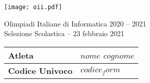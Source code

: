 \documentclass[a4paper]{article}
\begin{document}

\begin{center}
    \begin{minipage}{0.45\textwidth}
        \centering
        \texttt{[image: oii.pdf]}\\
    \end{minipage}
\end{center}

\vspace{0.15cm}

\begin{center}
    \Huge
    Olimpiadi Italiane di Informatica
    \huge 2020 -- 2021
    \\
    \LARGE Selezione Scolastica -- 23 febbraio 2021
\end{center}

\vspace{1cm}

{
    \Large

    \begin{tabularx}{\textwidth}{|l|Y|}  %
        \hline
        \textbf{Atleta} & ${nome}$ ${cognome}$ \\
        \hline
        \textbf{Codice Univoco} & \texttt{${codice_form}$} \\
        \hline
    \end{tabularx}
}
\end{document}

